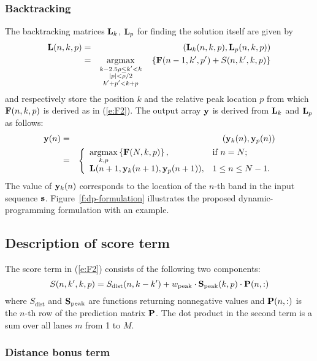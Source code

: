 \subsubsection{Backtracking}
The backtracking matrices ${\mathbf{L}}_k$, ${\mathbf{L}}_p$ for finding the solution itself are given by
\begin{eqnarray}\label{e:L}
\bL(n,k,p)&=&(\bL_k(n,k,p), \bL_p(n,k,p)) \\
&=&\argmax_{\substack{k-2.5\rho \le k' < k\\|p| < \rho/2\\k'+p' < k+p}}\quad \left\{ \bF(n-1,k',p') + S(n,k',k,p) \right\} \nonumber
\end{eqnarray}
and respectively store the position $k$ and the relative peak location $p$ from which ${\mathbf{F}}(n,k,p)$ is derived as in (\ref{e:F2}). The output array ${\mathbf{y}}$ is derived from ${\mathbf{L}}_k$ and ${\mathbf{L}}_p$ as follows:
%
\begin{eqnarray}\label{e:y}
\by(n) & = & (\by_k(n), \by_p(n)) \\
& = & \left\{
  \begin{array}{ll} \nonumber
    \argmax\limits_{k,p} \left\{\bF(N,k,p)\right\}, & \hbox{if $n = N$;} \\
    \bL(n+1, \by_k(n+1), \by_p(n+1)), & \hbox{$1 \le n \le N-1$.}
  \end{array}
\right.
\end{eqnarray}
%
The value of ${\mathbf{y}}_k(n)$ corresponds to the location of the $n$-th band in the input sequence ${\mathbf{s}}$. Figure~\ref{f:dp-formulation} illustrates the proposed dynamic-programming formulation with an example.


\subsection{Description of score term}\label{ss:cost}
The score term in (\ref{e:F2}) consists of the following two components:
%
\begin{equation}\label{e:score-term}
S(n,k',k,p) = S_{\textrm{dist}}(n,k-k') + w_{\textrm{peak}} \cdot \bold{S}_{\textrm{peak}} (k,p) \cdot {\mathbf{P}}(n, :)
\end{equation}
%
where $S_\textrm{dist}$ and $\bold{S}_\textrm{peak}$ are functions returning nonnegative values and ${\mathbf{P}}(n,:)$ is the $n$-th row of the prediction matrix ${\mathbf{P}}$. The dot product in the second term is a sum over all lanes $m$ from 1 to $M$.


\subsubsection{Distance bonus term}

